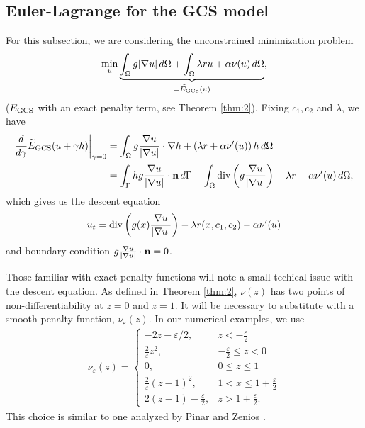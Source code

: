 \subsection{Euler-Lagrange for the GCS model}
For this subsection, we are considering the unconstrained minimization problem 
\begin{align*}
\min_u \underbrace{\int_{\Omega } g\lvert\nabla u\rvert \,d\Omega 
+ \int_{\Omega} \lambda r u + \alpha \nu(u) \,d\Omega }_{=\widetilde E_{\textrm{GCS}}(u)},
\end{align*}
($E_\textrm{GCS}$ with an exact penalty term, see Theorem \ref{thm:2}).
Fixing $c_1, c_2$ and $\lambda$, we have
\begin{align*}
\frac{d}{d\gamma} \widetilde E_\textrm{GCS}(u + \gamma h)
\bigg\rvert_{\gamma = 0} 
&= \int_{\Omega} g \frac{\nabla u}{\lvert\nabla u\rvert} \cdot \nabla h
+ \left( \lambda r + \alpha \nu'(u) \right) h \,d\Omega 
\\
&= \int_{\Gamma} h g \frac{\nabla u}{\lvert\nabla u\rvert} \cdot \mathbf{n}  \, d \Gamma - \int_{\Omega } \operatorname{div}\left( g \frac{\nabla u}{\lvert\nabla u\rvert} \right) - \lambda r - \alpha \nu'(u) \,d\Omega ,
\end{align*}
which gives us the descent equation 
\begin{align}
\label{eq:gcs_el}
u_t = \operatorname{div}\left( g(x)  \frac{\nabla u}{\lvert\nabla u\rvert} \right) - \lambda r(x,c_1,c_2)- \alpha \nu'(u)
\end{align}
and boundary condition $g\frac{\nabla u}{\lvert\nabla u\rvert} \cdot \mathbf{n} = 0$. 

Those familiar with exact penalty functions will note a small techical issue with the descent equation. As defined in Theorem \ref{thm:2}, $\nu(z)$ has two points of non-differentiability at $z = 0$ and $z = 1$. It will be necessary to substitute with a smooth penalty function, $\nu_\varepsilon(z)$. In our numerical examples, we use
\begin{align*}
\nu_\varepsilon(z) = \begin{cases}
-2z - \varepsilon/2, & z < -\frac{\varepsilon }{2}
\\
\frac{2}{\varepsilon} z^2, &-\frac{\varepsilon}{2} \leq z < 0
\\
0, & 0\leq z \leq 1
\\
\frac{2}{\varepsilon}(z-1)^2, & 1 < x \leq 1 + \frac{\varepsilon }{2}
\\
2(z - 1) - \frac{\varepsilon }{2}, & z > 1+\frac{\varepsilon }{2}.
\end{cases}
\end{align*}
This choice is similar to one analyzed by Pinar and Zenios \cite{pinar1994smoothing}.


